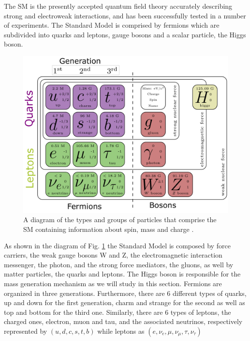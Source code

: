 \documentclass[12pt]{article}
\begin{document}
The SM is the presently accepted quantum field theory accurately describing strong and electroweak interactions, and has been successfully tested in a number of experiments. 
%
%
The Standard Model is comprised by fermions which are subdivided into quarks and leptons, gauge bosons and a scalar particle, the Higgs boson.
%
\begin{figure}[H]
\centering
  \includegraphics[width=0.7 \linewidth]{SM.png}
  \caption{A diagram of the types and groups of particles that comprise the SM containing information about spin, mass and charge \cite{wiki:sm}.}\label{fig:SMdiag} 
  \end{figure}
%
%
As shown in the diagram of Fig. \ref{fig:SMdiag} the Standard Model is composed by force carriers, the weak gauge bosons W and Z, the electromagnetic interaction messenger, the photon, and the strong force mediators, the gluons, as well by matter particles, the quarks and leptons. The Higgs boson is responsible for the mass generation mechanism as we will study in this section.
%
Fermions are organized in three generations. Furthermore, there are 6 different types of quarks, up and down for the first generation, charm and strange for the second as well as top and bottom for the third one. Similarly, there are 6 types of leptons, the charged ones, electron, muon and tau, and the associated neutrinos, respectively represented by $(u,d,c,s,t,b)$ while leptons as $(e,\nu_{e},\mu,\nu_{\mu},\tau,\nu_{\tau})$
\end{document}

